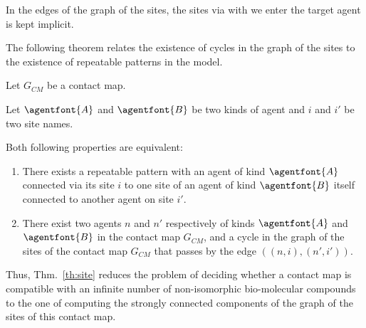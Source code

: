 \documentclass{entcs}
\newcommand{\graphsymb}{G}
\begin{document}
In the edges of the graph of the sites, the sites via with we enter the target agent is kept implicit.

The following theorem relates the existence of cycles in the graph of the sites to the existence of repeatable patterns in the model.

\begin{theorem}
  \label{th:site}
  Let $\graphsymb_{\textit{CM}}$ be a contact map.

Let $\agentfont{A}$ and $\agentfont{B}$ be two kinds of agent and
$i$ and $i'$ be two site names.

  Both following properties are equivalent:
  \begin{enumerate}
    \item There exists a repeatable pattern
    with an agent of kind $\agentfont{A}$ connected via its site $i$
    to one site of an agent of kind $\agentfont{B}$ itself connected to another agent on site $i'$.
\item There exist two agents $n$ and $n'$ respectively of kinds $\agentfont{A}$
and  $\agentfont{B}$ in the contact map $\graphsymb_{\textit{CM}}$, and a  cycle in the graph of the sites of the contact map    $\graphsymb_{\textit{CM}}$  that passes by the edge $((n,i),(n',i'))$.
  \end{enumerate}
\end{theorem}

Thus, Thm.~\ref{th:site} reduces the problem of deciding whether
a contact map is compatible with an infinite number of non-isomorphic bio-molecular compounds to the one of computing the strongly connected components of the graph of the sites of this contact map.
\end{document}
